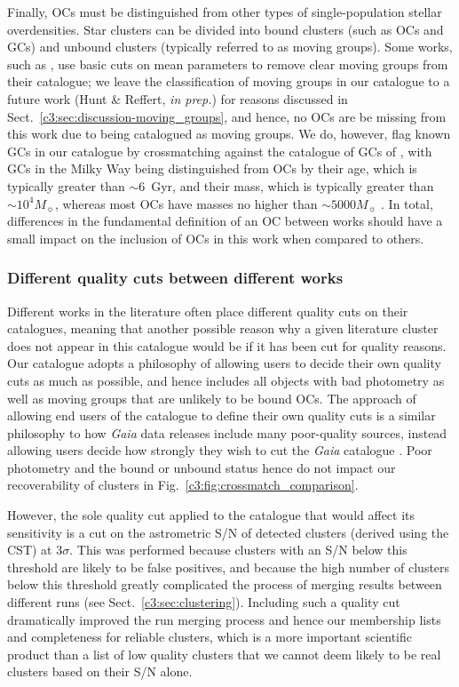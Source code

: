 Finally, OCs must be distinguished from other types of single-population stellar overdensities. Star clusters can be divided into bound clusters (such as OCs and GCs) and unbound clusters (typically referred to as moving groups). Some works, such as \cite{cantat-gaudin_clusters_2020}, use basic cuts on mean parameters to remove clear moving groups from their catalogue; we leave the classification of moving groups in our catalogue to a future work (Hunt \& Reffert, \emph{in prep.}) for reasons discussed in Sect.~\ref{c3:sec:discussion-moving_groups}, and hence, no OCs are be missing from this work due to being catalogued as moving groups. We do, however, flag known GCs in our catalogue by crossmatching against the catalogue of GCs of \cite{vasiliev_gaia_2021}, with GCs in the Milky Way being distinguished from OCs by their age, which is typically greater than $\sim 6$~Gyr, and their mass, which is typically greater than $\sim 10^4 M_\sun$, whereas most OCs have masses no higher than $\sim 5000 M_\sun$ \citep{kharchenko_global_2013}. In total, differences in the fundamental definition of an OC between works should have a small impact on the inclusion of OCs in this work when compared to others.

\subsubsection{Different quality cuts between different works}\label{c3:sec:discussion-undetected:methodological-reasons:2-cuts}

Different works in the literature often place different quality cuts on their catalogues, meaning that another possible reason why a given literature cluster does not appear in this catalogue would be if it has been cut for quality reasons. Our catalogue adopts a philosophy of allowing users to decide their own quality cuts as much as possible, and hence includes all objects with bad photometry as well as moving groups that are unlikely to be bound OCs. The approach of allowing end users of the catalogue to define their own quality cuts is a similar philosophy to how \emph{Gaia} data releases include many poor-quality sources, instead allowing users decide how strongly they wish to cut the \emph{Gaia} catalogue \citep{gaia_collaboration_gaia_2021}. Poor photometry and the bound or unbound status hence do not impact our recoverability of clusters in Fig.~\ref{c3:fig:crossmatch_comparison}.

However, the sole quality cut applied to the catalogue that would affect its sensitivity is a cut on the astrometric S/N of detected clusters (derived using the CST) at 3$\sigma$. This was performed because clusters with an S/N below this threshold are likely to be false positives, and because the high number of clusters below this threshold greatly complicated the process of merging results between different runs (see Sect.~\ref{c3:sec:clustering}). Including such a quality cut dramatically improved the run merging process and hence our membership lists and completeness for reliable clusters, which is a more important scientific product than a list of low quality clusters that we cannot deem likely to be real clusters based on their S/N alone.

